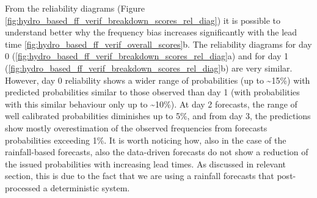 From the reliability diagrams (Figure \ref{fig:hydro_based_ff_verif_breakdown_scores_rel_diag}) it is possible to understand better why the frequency bias increases significantly with the lead time \ref{fig:hydro_based_ff_verif_overall_scores}b. The reliability diagrams for day 0 (\ref{fig:hydro_based_ff_verif_breakdown_scores_rel_diag}a) and for day 1 (\ref{fig:hydro_based_ff_verif_breakdown_scores_rel_diag}b) are very similar. However, day 0 reliability shows a wider range of probabilities (up to \sim 15\%) with predicted probabilities similar to those observed than day 1 (with probabilities with this similar behaviour only up to \sim 10\%). At day 2 forecasts, the range of well calibrated probabilities diminishes up to 5\%, and from day 3, the predictions show mostly overestimation of the observed frequencies from forecasts probabilities exceeding 1\%. It is worth noticing how, also in the case of the rainfall-based forecasts, also the data-driven forecasts do not show a reduction of the issued probabilities with increasing lead times. As discussed in relevant section, this is due to the fact that we are using a rainfall forecasts that post-processed a deterministic system.

